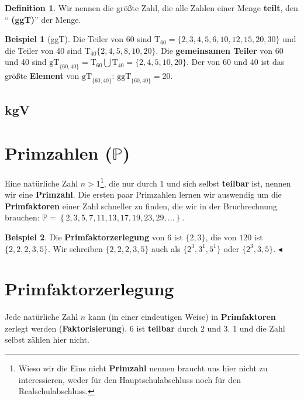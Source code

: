 \documentclass[a4paper]{book}%
\newcommand{\topicend}{
      $\blacktriangleleft$
}
\theoremstyle{definition}
\newtheorem{definition}{Definition}
\newtheorem{beispiel}{Beispiel}
\begin{document}
\begin{definition}
    Wir nennen die größte Zahl, die alle Zahlen einer Menge \textbf{teilt}, den \enquote{\textbf{ (ggT)}} der Menge.
\end{definition}

\begin{beispiel}[ggT]
    Die Teiler von 60 sind $\text{T}_{60} = \{2,3,4,5,6,10,12,15,20,30\}$ und die Teiler von 40 sind $\text{T}_{40}\{2,4,5,8,10,20\}$. Die \textbf{gemeinsamen Teiler} von 60 und 40 sind $\text{gT}_{\{60,40\}} = \text{T}_{60} \bigcup \text{T}_{40} = \{2,4,5,10,20\}$. Der \textbf{} von 60 und 40 ist das größte \textbf{Element} von $\text{gT}_{\{60,40\}}$: $\text{ggT}_{\{60,40\}}=20$.
\end{beispiel}


\subsection{kgV}



\section{Primzahlen ($\mathbb{P}$)}

Eine natürliche Zahl $n > 1$\footnote{Wieso wir die Eins nicht \textbf{Primzahl} nennen braucht uns hier nicht zu interessieren, weder für den Hauptschulabschluss noch für den Realschulabschluss.}, die nur durch 1 und sich selbst \textbf{teilbar} ist, nennen wir eine \textbf{Primzahl}. Die ersten paar Primzahlen lernen wir auswendig um die \textbf{Primfaktoren} einer Zahl schneller zu finden, die wir in der Bruchrechnung brauchen: $\mathbb{P}=\left\{2, 3, 5, 7, 11, 13, 17, 19, 23, 29, ...\right\}$.

\begin{beispiel}
    Die \textbf{Primfaktorzerlegung} von $6$ ist $\{2,3\}$, die von $120$ ist $\{2,2,2,3,5\}$. Wir schreiben $\{2,2,2,3,5\}$ auch als $\{2^3,3^1,5^1\}$ oder $\{2^3,3,5\}$.\topicend
\end{beispiel}


\section{Primfaktorzerlegung}

Jede natürliche Zahl $n$ kann (in einer eindeutigen Weise) in \textbf{Primfaktoren} zerlegt werden (\textbf{Faktorisierung}). 6 ist \textbf{teilbar} durch 2 und 3. 1 und die Zahl selbst zählen hier nicht.
\end{document}
